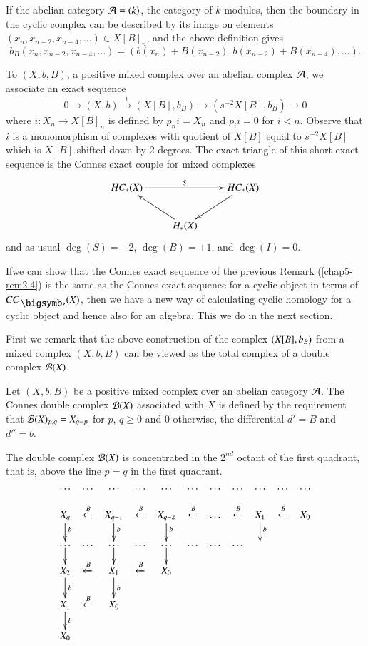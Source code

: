 If the abelian category $\mathcal{A}=(k)$, the category of $k$-modules, then
the boundary in the cyclic complex can be described by its image on
elements $(x_{n},x_{n-2},x_{n-4},\ldots)\in X[B]_{n}$, and the above
definition gives
$$
b_{B}(x_{n},x_{n-2},x_{n-4},\ldots)=(b(x_{n})+B(x_{n-2}),b(x_{n-2})+B(x_{n-4}),\ldots). 
$$

\begin{remark}\label{chap5-rem2.4}
To $(X,b,B)$, a positive mixed complex over an abelian complex $\mathcal{A}$,
we associate an exact sequence
$$
0\to (X,b)\xrightarrow{i}(X[B],b_{B})\to (s^{-2}X[B],b_{B})\to 0
$$
where $i:X_{n}\to X[B]_{n}$ is defined by $p_{n}i=X_{n}$ and
$p_{i}i=0$ for $i<n$. Observe that $i$ is a monomorphism of complexes
with quotient of $X[B]$ equal to $s^{-2}X[B]$ which is $X[B]$ shifted
down by 2 degrees. The exact triangle of this short exact sequence is
the Connes exact couple for mixed complexes
\[
\xymatrix{
HC_{\ast}(X)\ar[rr]^{S} & & HC_{\ast}(X)\ar[dl]\\
 & H_{\ast}(X)\ar[ul] & 
}
\]
and as usual $\deg(S)=-2$, $\deg(B)=+1$, and $\deg(I)=0$.
\end{remark}

If\pageoriginale we can show that the Connes exact sequence of the
previous Remark (\ref{chap5-rem2.4}) is the same as the Connes exact
sequence for a cyclic object in terms of $CC_{\bigdot}(X)$, then we
have a new way of calculating cyclic homology for a cyclic object and
hence also for an algebra. This we do in the next section.

First we remark that the above construction of the complex
$(X[B],\break b_{B})$ from a mixed complex $(X,b,B)$ can be viewed as the
total complex of a double complex $\mathcal{B}(X)$. 

\begin{definition}\label{chap5-defi2.5}
Let $(X,b,B)$ be a positive mixed complex over an abelian category
$\mathcal{A}$. The Connes double complex $\mathcal{B}(X)$ associated with $X$ is defined
by the requirement that $\mathcal{B}(X)_{p,q}=X_{q-p}$ for $p$, $q\geq 0$ and
$0$ otherwise, the differential $d'=B$ and $d''=b$.
\end{definition}

The double complex $\mathcal{B}(X)$ is concentrated in the $2^{nd}$ octant of the
first quadrant, that is, above the line $p=q$ in the first quadrant.
\[
\xymatrix@C=.2cm@R=.5cm{
\ldots & \ldots & \ldots & \ldots & \ldots & \ldots & \ldots & \ldots
& \ldots & \ldots & \ldots\\
X_{q}\ar[d]^{b} & \xleftarrow{B} & X_{q-1}\ar[d]^{b} & \xleftarrow{B}
& X_{q-2}\ar[d]^{b} & \xleftarrow{B} & \ldots & \xleftarrow{B} & 
X_{1}\ar[d]^{b}  & \xleftarrow{B} & X_{0}\\
\ldots\ar[d] & \ldots &  \ldots\ar[d] &  \ldots &  \ldots\ar[d] &
\ldots &  \ldots & \ldots & & & \\
X_{2}\ar[d]^{b} & \xleftarrow{B} & X_{1}\ar[d]^{b} & \xleftarrow{B} & X_{0} & & & & & \\
X_{1}\ar[d]^{b} & \xleftarrow{B} & X_{0} & & & & & & & &\\
X_{0} & 
}
\]

